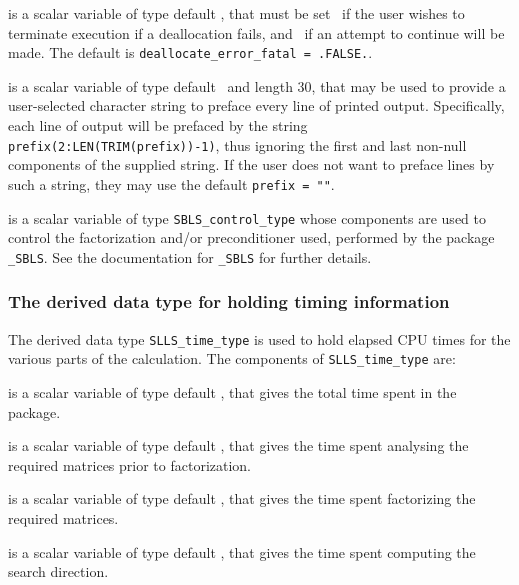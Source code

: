 \documentclass{galahad}
\newcommand{\packagename}{SLLS}
\begin{document}
\begin{description}
 is a scalar variable of type default \logical,
that must be set \true\ if the user wishes to terminate execution if
a deallocation  fails, and \false\ if an attempt to continue
will be made. The default is {\tt deallocate\_error\_fatal = .FALSE.}.

 is a scalar variable of type default \character\
and length 30, that may be used to provide a user-selected
character string to preface every line of printed output.
Specifically, each line of output will be prefaced by the string
{\tt prefix(2:LEN(TRIM(prefix))-1)},
thus ignoring the first and last non-null components of the
supplied string. If the user does not want to preface lines by such
a string, they may use the default {\tt prefix = ""}.

 is a scalar variable of type
{\tt SBLS\_control\_type} %
whose components are used to control the factorization and/or
preconditioner used,
performed by the package
{\tt \libraryname\_SBLS}.
See the documentation for {\tt \libraryname\_SBLS} for further details.

\end{description}


\subsubsection{The derived data type for holding timing
 information}\label{typetime}
The derived data type
{\tt \packagename\_time\_type}
is used to hold elapsed CPU times for the various parts of the calculation.
The components of
{\tt \packagename\_time\_type}
are:
\begin{description}
 is a scalar variable of type default \real, that gives
 the total time spent in the package.

 is a scalar variable of type default \real, that gives
 the time spent analysing the required matrices prior to factorization.

 is a scalar variable of type default \real, that gives
 the time spent factorizing the required matrices.

 is a scalar variable of type default \real, that gives
 the time spent computing the search direction.

\end{description}

\end{document}

